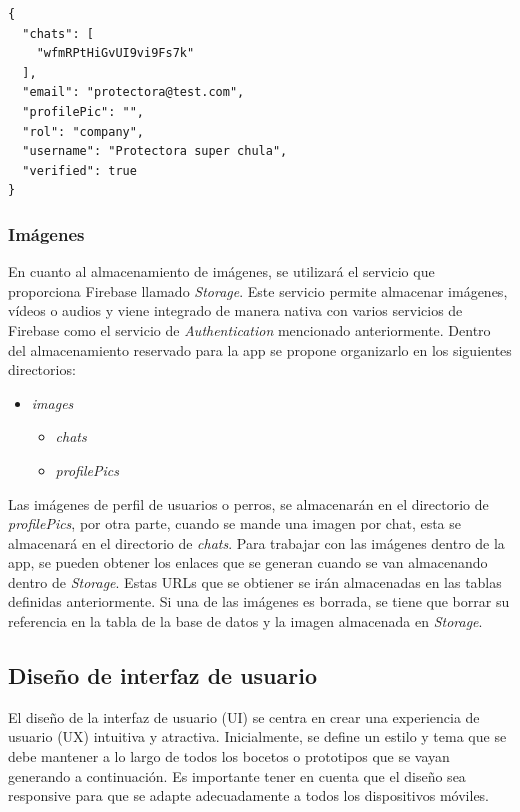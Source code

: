 \documentclass[a4paper, 12pt]{article}
\begin{document}
\begin{verbatim}
{
  "chats": [
    "wfmRPtHiGvUI9vi9Fs7k"
  ],
  "email": "protectora@test.com",
  "profilePic": "",
  "rol": "company",
  "username": "Protectora super chula",
  "verified": true
}
\end{verbatim}

\subsubsection{Imágenes}

En cuanto al almacenamiento de imágenes, se utilizará el servicio que proporciona Firebase llamado \textit{Storage}. Este servicio permite almacenar imágenes, vídeos o audios y viene integrado de manera nativa con varios servicios de Firebase como el servicio de \textit{Authentication} mencionado anteriormente. Dentro del almacenamiento reservado para la app se propone organizarlo en los siguientes directorios:

\begin{itemize}[noitemsep]
	\item \textit{images}
	\begin{itemize}[noitemsep]
		\item \textit{chats}
		\item \textit{profilePics}
	\end{itemize}
\end{itemize}

Las imágenes de perfil de usuarios o perros, se almacenarán en el directorio de \textit{profilePics}, por otra parte, cuando se mande una imagen por chat, esta se almacenará en el directorio de \textit{chats}. Para trabajar con las imágenes dentro de la app, se pueden obtener los enlaces que se generan cuando se van almacenando dentro de \textit{Storage}.  Estas URLs que se obtiener se irán almacenadas en las tablas definidas anteriormente. Si una de las imágenes es borrada, se tiene que borrar su referencia en la tabla de la base de datos y la imagen almacenada en \textit{Storage}.

\subsection{Diseño de interfaz de usuario}

El diseño de la interfaz de usuario (UI) se centra en crear una experiencia de usuario (UX) intuitiva y atractiva. Inicialmente, se define un estilo y tema que se debe mantener a lo largo de todos los bocetos o prototipos que se vayan generando a continuación. Es importante tener en cuenta que el diseño sea responsive para que se adapte adecuadamente a todos los dispositivos móviles. 
\end{document}
